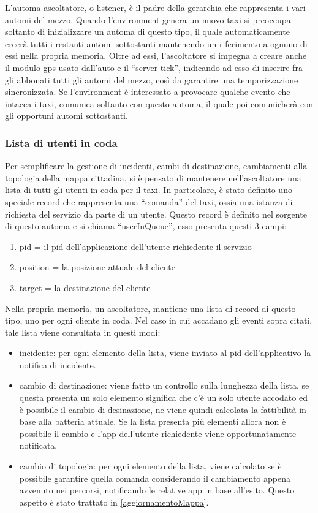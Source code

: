 L'automa ascoltatore, o listener, è il padre della gerarchia che rappresenta i vari automi del mezzo. Quando l'environment genera un nuovo taxi si preoccupa soltanto di inizializzare un automa di questo tipo, il quale automaticamente creerà tutti i restanti automi sottostanti mantenendo un riferimento a ognuno di essi nella propria memoria. Oltre ad essi, l'ascoltatore si impegna a creare anche il modulo gps usato dall'auto e il ``server tick'', indicando ad esso di inserire fra gli abbonati tutti gli automi del mezzo, così da garantire una temporizzazione sincronizzata. Se l'environment è interessato a provocare qualche evento che intacca i taxi, comunica soltanto con questo automa, il quale poi comunicherà con gli opportuni automi sottostanti.

\subsubsection{Lista di utenti in coda} \label{usersInQueue}

Per semplificare la gestione di incidenti, cambi di destinazione, cambiamenti alla topologia della mappa cittadina, si è pensato di mantenere nell'ascoltatore una lista di tutti gli utenti in coda per il taxi. In particolare, è stato definito uno speciale record che rappresenta una ``comanda'' del taxi, ossia una istanza di richiesta del servizio da parte di un utente.
Questo record è definito nel sorgente di questo automa e si chiama ``userInQueue'', esso presenta questi 3 campi:

\begin{enumerate}
	\item pid = il pid dell'applicazione dell'utente richiedente il servizio
	\item position = la posizione attuale del cliente 
	\item target = la destinazione del cliente
\end{enumerate}

Nella propria memoria, un ascoltatore, mantiene una lista di record di questo tipo, uno per ogni cliente in coda.
Nel caso in cui accadano gli eventi sopra citati, tale lista viene consultata in questi modi:
\begin{itemize}
	\item incidente: per ogni elemento della lista, viene inviato al pid dell'applicativo la notifica di incidente.
	\item cambio di destinazione: viene fatto un controllo sulla lunghezza della lista, se questa presenta un solo elemento significa che c'è un solo utente accodato ed è possibile il cambio di desinazione, ne viene quindi calcolata la fattibilità in base alla batteria attuale. Se la lista presenta più elementi allora non è possibile il cambio e l'app dell'utente richiedente viene opportunatamente notificata.
	\item cambio di topologia: per ogni elemento della lista, viene calcolato se è possibile garantire quella comanda considerando il cambiamento appena avvenuto nei percorsi, notificando le relative app in base all'esito. Questo aspetto è stato trattato in \ref{aggiornamentoMappa}.
\end{itemize}

